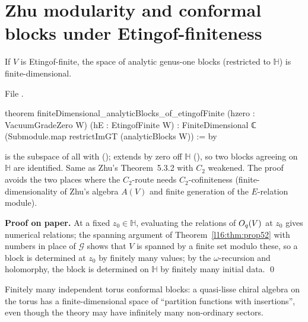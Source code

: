 \section{Zhu modularity and conformal blocks under Etingof-finiteness}\label{l16:sec:zhu}

\begin{theorem}\label{l16:thm:blocks}
If $V$ is Etingof-finite, the space of analytic genus-one blocks (restricted to $\mathbb H$) is finite-dimensional.
\end{theorem}
\noindent File .
\begin{leancode}
theorem finiteDimensional_analyticBlocks_of_etingofFinite (hzero : VacuumGradeZero W)
    (hE : EtingofFinite W) :
    FiniteDimensional ℂ (Submodule.map restrictImGT (analyticBlocks W)) := by
\end{leancode}

\begin{dictionary}
 is the subspace of all  with 
();  extends by zero off $\mathbb H$
(), so two blocks agreeing on $\mathbb H$ are identified. Same as
Zhu's Theorem~5.3.2 with $C_2$ weakened. The proof avoids the two places where the $C_2$-route needs $C_2$-cofiniteness
(finite-dimensionality of Zhu's algebra $A(V)$ and finite generation of the $E$-relation module).
\end{dictionary}

\textbf{Proof on paper.} At a fixed $z_0\in\mathbb H$, evaluating the relations of $O_q(V)$ at $z_0$ gives numerical
relations; the spanning argument of Theorem~\ref{l16:thm:prop52} with numbers in place of $\mathcal G$ shows that $V$ is
spanned by a finite set modulo these, so a block is determined at $z_0$ by finitely many values; by the
$\omega$-recursion and holomorphy, the block is determined on $\mathbb H$ by finitely many initial data. \qed

\begin{physics}
Finitely many independent torus conformal blocks: a quasi-lisse chiral algebra on the torus has a finite-dimensional
space of ``partition functions with insertions'', even though the theory may have infinitely many non-ordinary sectors.
\end{physics}


